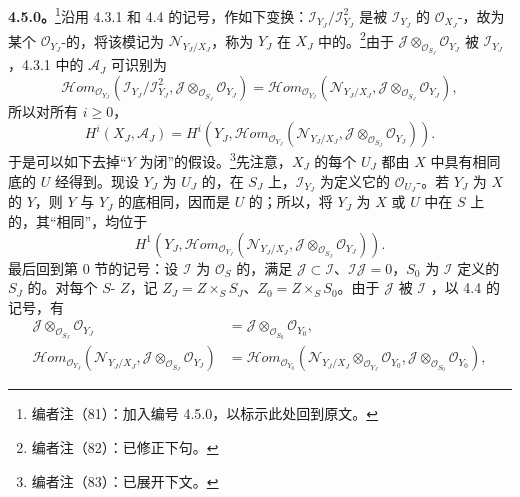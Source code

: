 \textbf{4.5.0。}\footnote{编者注（81）：加入编号 4.5.0，以标示此处回到原文。}沿用 4.3.1 和 4.4 的记号，作如下变换：$\mathscr I_{Y_J}/\mathscr I_{Y_J}^2$ 是被 $\mathscr I_{Y_J}$ 的 $\mathscr O_{X_J}$-，故为某个 $\mathscr O_{Y_J}$-的，将该模记为 $\mathscr N_{Y_J/X_J}$，称为 $Y_J$ 在 $X_J$ 中的。\footnote{编者注（82）：已修正下句。}由于 $\mathscr J\otimes_{\mathscr O_{S_J}}\mathscr O_{Y_J}$ 被 $\mathscr I_{Y_J}$ ，4.3.1 中的 $\mathscr A_J$ 可识别为
\[\mathscr Hom_{\mathscr O_{Y_J}}(\mathscr I_{Y_J}/\mathscr I_{Y_J}^2,\mathscr J\otimes_{\mathscr O_{S_J}}\mathscr O_{Y_J})=\mathscr Hom_{\mathscr O_{Y_J}}(\mathscr N_{Y_J/X_J},\mathscr J\otimes_{\mathscr O_{S_J}}\mathscr O_{Y_J}),\]
所以对所有 $i\geq0$，
\[H^i(X_J,\mathscr A_J)=H^i(Y_J,\mathscr Hom_{\mathscr O_{Y_J}}(\mathscr N_{Y_J/X_J},\mathscr J\otimes_{\mathscr O_{S_J}}\mathscr O_{Y_J})).\]
于是可以如下去掉“$Y$ 为闭”的假设。\footnote{编者注（83）：已展开下文。}先注意，$X_J$ 的每个 $U_J$ 都由 $X$ 中具有相同底的 $U$ 经得到。现设 $Y_J$ 为 $U_J$ 的，在 $S_J$ 上，$\mathscr I_{Y_J}$ 为定义它的 $\mathscr O_{U_J}$-。若 $Y_J$ 为 $X$ 的 $Y$，则 $Y$ 与 $Y_J$ 的底相同，因而是 $U$ 的；所以，将 $Y_J$ 为 $X$ 或 $U$ 中在 $S$ 上的，其“相同”，均位于
\[H^1(Y_J,\mathscr Hom_{\mathscr O_{Y_J}}(\mathscr N_{Y_J/X_J},\mathscr J\otimes_{\mathscr O_{S_J}}\mathscr O_{Y_J})).\]
最后回到第 0 节的记号：设 $\mathscr I$ 为 $\mathscr O_S$ 的，满足 $\mathscr J\subset\mathscr I$、$\mathscr I\mathscr J=0$，$S_0$ 为 $\mathscr I$ 定义的 $S_J$ 的。对每个 $S$- $Z$，记 $Z_J=Z\times_S S_J$、$Z_0=Z\times_S S_0$。由于 $\mathscr J$ 被 $\mathscr I$ ，以 4.4 的记号，有
\[
\begin{aligned}
\mathscr J\otimes_{\mathscr O_{S_J}}\mathscr O_{Y_J}&=\mathscr J\otimes_{\mathscr O_{S_0}}\mathscr O_{Y_0},\\
\mathscr Hom_{\mathscr O_{Y_J}}(\mathscr N_{Y_J/X_J},\mathscr J\otimes_{\mathscr O_{S_J}}\mathscr O_{Y_J})&=\mathscr Hom_{\mathscr O_{Y_0}}(\mathscr N_{Y_J/X_J}\otimes_{\mathscr O_{Y_J}}\mathscr O_{Y_0},\mathscr J\otimes_{\mathscr O_{S_0}}\mathscr O_{Y_0}),
\end{aligned}
\]
